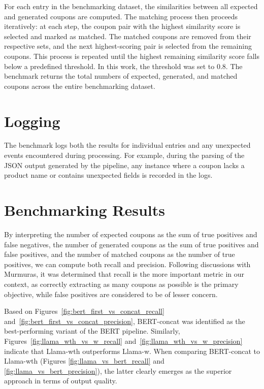 \documentclass[licencjacka,en]{pracamgr}
\begin{document}
For each entry in the benchmarking dataset, the similarities between all expected and generated coupons are computed. The matching process then proceeds iteratively: at each step, the coupon pair with the highest similarity score is selected and marked as matched. The matched coupons are removed from their respective sets, and the next highest-scoring pair is selected from the remaining coupons. This process is repeated until the highest remaining similarity score falls below a predefined threshold. In this work, the threshold was set to 0.8. The benchmark returns the total numbers of expected, generated, and matched coupons across the entire benchmarking dataset.

\section{Logging}

The benchmark logs both the results for individual entries and any unexpected events encountered during processing. For example, during the parsing of the JSON output generated by the pipeline, any instance where a coupon lacks a product name or contains unexpected fields is recorded in the logs.

\section{Benchmarking Results}

By interpreting the number of expected coupons as the sum of true positives and false negatives, the number of generated coupons as the sum of true positives and false positives, and the number of matched coupons as the number of true positives, we can compute both recall and precision. Following discussions with Murmuras, it was determined that recall is the more important metric in our context, as correctly extracting as many coupons as possible is the primary objective, while false positives are considered to be of lesser concern.

Based on Figures~\ref{fig:bert_first_vs_concat_recall} and~\ref{fig:bert_first_vs_concat_precision}, BERT-concat was identified as the best-performing variant of the BERT pipeline. Similarly, Figures~\ref{fig:llama_wth_vs_w_recall} and~\ref{fig:llama_wth_vs_w_precision} indicate that Llama-wth outperforms Llama-w. When comparing BERT-concat to Llama-wth (Figures \ref{fig:llama_vs_bert_recall} and \ref{fig:llama_vs_bert_precision}), the latter clearly emerges as the superior approach in terms of output quality.
\end{document}
